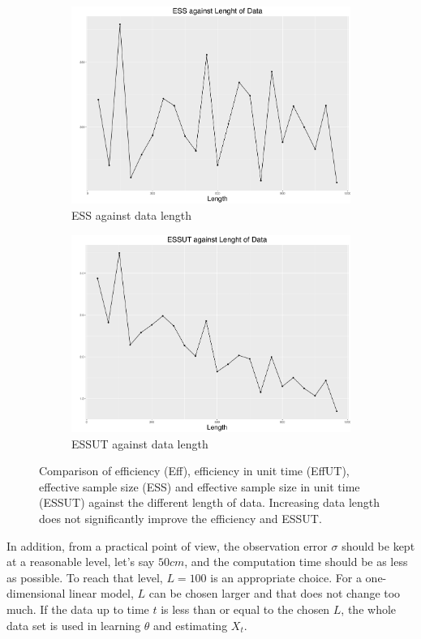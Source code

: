 \begin{figure}[h]
\begin{subfigure}[t]{0.45\textwidth}
    \includegraphics[width=\textwidth]{Chapters/05MCMCOU/plots/simudataOUlengthess.pdf}
    \caption{ESS against data length}
\end{subfigure}
\begin{subfigure}[t]{0.45\textwidth}
    \includegraphics[width=\textwidth]{Chapters/05MCMCOU/plots/simudataOUlengthessut.pdf}
    \caption{ESSUT against data length}
\end{subfigure}
\caption{Comparison of efficiency (Eff), efficiency in unit time (EffUT), effective sample size (ESS) and effective sample size in unit time (ESSUT) against the different length of data. Increasing data length does not significantly improve the efficiency and ESSUT.}\label{compareLengthData}
\end{figure}
In addition, from a practical point of view, the observation error $\sigma$ should be kept at a reasonable level, let's say $50cm$, and the computation time should be as less as possible. To reach that level, $L=100$ is an appropriate choice. For a one-dimensional linear model, $L$ can be chosen larger and that does not change too much. If the data up to time $t$ is less than or equal to the chosen $L$, the whole data set is used in learning $\theta$ and estimating $X_t$. 


